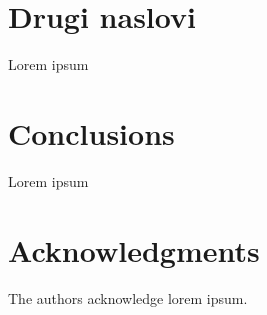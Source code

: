 \documentclass{acm_proc_article-sp}
\begin{document}
\section{Drugi naslovi}

Lorem ipsum

\section{Conclusions}

Lorem ipsum

\section{Acknowledgments}

The authors acknowledge lorem ipsum.





\balancecolumns
\end{document}
